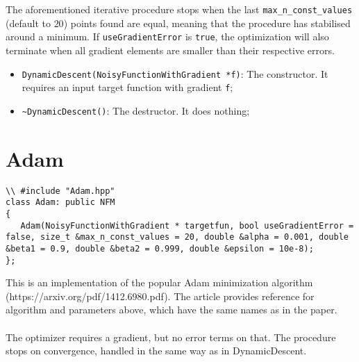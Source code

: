 \documentclass[11pt,a4paper,twoside]{article}
\begin{document}
The aforementioned iterative procedure stops when the last \verb+max_n_const_values+ (default to $20$) points found are equal, meaning that the procedure has stabilised around a minimum. If \verb+useGradientError+ is \verb+true+, the optimization will also terminate when all gradient elements are smaller than their respective errors.

\begin{itemize}
\item \verb+DynamicDescent(NoisyFunctionWithGradient *f)+: The constructor. It requires an input target function with gradient \verb+f+;
\item \verb+~DynamicDescent()+: The destructor. It does nothing;
\end{itemize}



\section{Adam} %
\label{sec:adam}

\begin{lstlisting}
\\ #include "Adam.hpp"
class Adam: public NFM
{
   Adam(NoisyFunctionWithGradient * targetfun, bool useGradientError = false, size_t &max_n_const_values = 20, double &alpha = 0.001, double &beta1 = 0.9, double &beta2 = 0.999, double &epsilon = 10e-8);
};
\end{lstlisting}

This is an implementation of the popular Adam minimization algorithm (https://arxiv.org/pdf/1412.6980.pdf). The article provides reference for algorithm and parameters above, which have the same names as in the paper.
\\\\The optimizer requires a gradient, but no error terms on that. The procedure stops on convergence, handled in the same way as in DynamicDescent. 


\printindex
\end{document}
